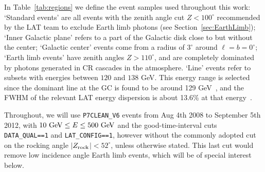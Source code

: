 \documentclass[aps,twocolumn,prd,superscriptaddress,showpacs,nofootinbib,fixfloat]{revtex4}
\newcommand{\GeV}{{\rm ~GeV}}
\newcommand{\zrock}{$Z_{\rm rock}$}
\begin{document}
In Table~\ref{tab:regions} we define the event samples
used throughout this work: `Standard events' are all
events with the zenith angle cut $Z<100^\circ$ recommended
by the LAT team to exclude Earth
limb photons (see Section~\ref{sec:EarthLimb}); `Inner
Galactic plane' refers to a part of the Galactic disk close
to but without the center; `Galactic center' events come from
a radius of $3^\circ$ around
$\ell=b=0^\circ$; `Earth limb events' have
zenith angles $Z>110^\circ$, and are completely
dominated by photons generated in CR cascades in the
atmosphere. `Line' events refer to subsets with energies
between $120$ and $138$ GeV. This energy range is selected
since the dominant line at the GC is found to be around 129
GeV~\cite{linepaper}, and the FWHM of the relevant LAT energy dispersion is about
13.6\% at that energy~\cite{Weniger:2012}.

Throughout, we will use \texttt{P7CLEAN\_V6} events from
Aug 4th 2008 to September 5th 2012, with $10\GeV\leq E\leq 500 \GeV$ and the good-time-interval cuts
\texttt{DATA\_QUAL==1} and \texttt{LAT\_CONFIG==1}, however
without the commonly adopted cut on the rocking angle
$|$\zrock$|<52^\circ$, unless otherwise stated. This last cut would remove
low incidence angle Earth limb events, which will be of special interest
below.
\medskip
\end{document}

